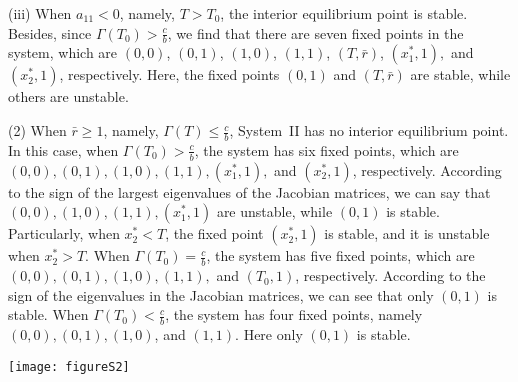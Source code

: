\documentclass[9pt]{elife}
\begin{document}
\begin{appendixbox}
(iii) When $a_{11}<0$, namely, $T>T_{0}$, the interior equilibrium point is stable. Besides, since $\Gamma(T_{0})>\frac{c}{b}$, we find that there are seven fixed points in the system, which are $(0, 0)$, $(0, 1)$, $(1, 0)$, $(1, 1)$, $(T, \bar{r})$, $(x_{1}^{*}, 1),$ and $(x_{2}^{*}, 1)$, respectively. Here, the fixed points $(0, 1)$ and $(T, \bar{r})$ are stable, while others are unstable.

(2) When $\bar{r}\geq1$, namely, $\Gamma(T)\leq\frac{c}{b}$, System~II has no interior equilibrium point. In this case, when $\Gamma(T_{0})>\frac{c}{b}$, the system has six fixed points, which are $(0, 0), (0, 1), (1, 0), (1, 1), (x_{1}^{*}, 1),$ and $(x_{2}^{*}, 1)$, respectively. According to the sign of the largest eigenvalues of the Jacobian matrices, we can say that $(0, 0), (1, 0), (1, 1), (x_{1}^{*}, 1)$ are unstable, while $(0, 1)$ is stable. Particularly, when $x_{2}^{*}<T$, the fixed point $(x_{2}^{*},1)$ is stable, and it is unstable when $x_{2}^{*}>T$. When $\Gamma(T_{0})=\frac{c}{b}$, the system has five fixed points, which are $(0, 0), (0, 1), (1, 0), (1, 1),$ and $(T_{0}, 1)$, respectively. According to the sign of the eigenvalues in the Jacobian matrices, we can see that only $(0, 1)$ is stable. When $\Gamma(T_{0})<\frac{c}{b}$, the system has four fixed points, namely $(0, 0), (0, 1), (1, 0)$, and $(1, 1)$. Here only $(0, 1)$ is stable.

\begin{center}
\texttt{[image: figureS2]}
\end{center}

\end{appendixbox}
\end{document}
